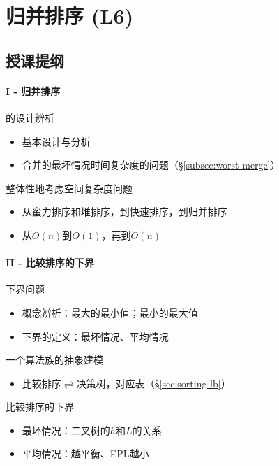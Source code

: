 \chapter{归并排序 (L6)} \label{chap:merge-sort}


\section*{授课提纲}

\subsubsection{I - 归并排序}

\nid {}的设计辨析
\begin{itemize}
    \item 基本设计与分析
    \item 合并的最坏情况时间复杂度的问题（\S\ref{subsec:worst-merge}）
\end{itemize}

\nid 整体性地考虑空间复杂度问题
\begin{itemize}
    \item 从蛮力排序和堆排序，到快速排序，到归并排序
    \item 从$O(n)$到$O(1)$，再到$O(n)$
\end{itemize}


\subsubsection{II - 比较排序的下界}

\nid 下界问题
\begin{itemize}
    \item 概念辨析：最大的最小值；最小的最大值
    \item 下界的定义：最坏情况、平均情况
\end{itemize}

\nid 一个算法族的抽象建模
\begin{itemize}
    \item 比较排序$\rightleftharpoons$决策树，对应表（\S\ref{sec:sorting-lb}） 
\end{itemize}

\nid 比较排序的下界
\begin{itemize}
    \item 最坏情况：二叉树的$h$和$L$的关系
    \item 平均情况：越平衡、EPL越小
\end{itemize}


